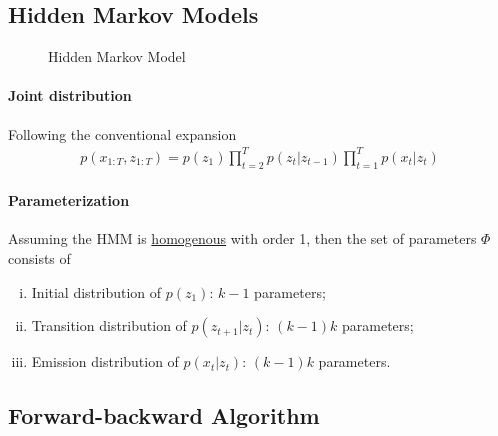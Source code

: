 \documentclass{article}
\begin{document}
	\subsection{Hidden Markov Models}
		\begin{figure}[H]
		\centering
		\caption{Hidden Markov Model}
	\end{figure}
	
	\paragraph{Joint distribution} Following the conventional expansion
	\begin{align}
		p(x_{1:T}, z_{1:T}) = p(z_1) \prod_{t=2}^T p(z_t|z_{t-1}) \prod_{t=1}^T p(x_t|z_t)
	\end{align}
	
	\paragraph{Parameterization} Assuming the HMM is \ul{homogenous} with order 1, then the set of parameters $\Phi$ consists of
	\begin{enumerate}[(i)]
		\item Initial distribution of $p(z_1)$: $k-1$ parameters;
		\item Transition distribution of $p(z_{t+1}|z_t)$: $(k-1)k$ parameters;
		\item Emission distribution of $p(x_t|z_t)$: $(k-1)k$ parameters.
	\end{enumerate}
	
	\subsection{Forward-backward Algorithm}
\end{document}

